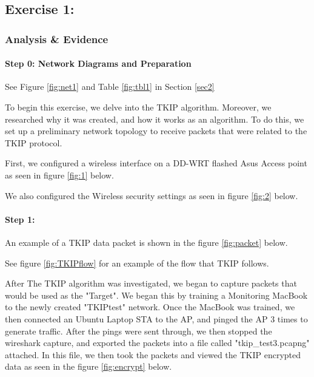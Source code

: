 \documentclass[main.tex]{subfiles}
\begin{document}
\subsection{Exercise 1: }
\subsubsection{Analysis \& Evidence }

\paragraph{Step 0: Network Diagrams and Preparation}
\hfill \break
See Figure \ref{fig:net1} and Table \ref{fig:tbl1} in Section \ref{sec2}

\noindent To begin this exercise, we delve into the TKIP algorithm. Moreover, we researched why it was created, and how it works as an algorithm. To do this, we set up a preliminary network topology to receive packets that were related to the TKIP protocol. 

First, we configured a wireless interface on a DD-WRT flashed Asus Access point as seen in figure \ref{fig:1} below.


We also configured the Wireless security settings as seen in figure \ref{fig:2} below. 


\paragraph{Step 1:}
\hfill \break

An example of a TKIP data packet is shown in the figure \ref{fig:packet} below.


See figure \ref{fig:TKIPflow} for an example of the flow that TKIP follows.
 
After The TKIP algorithm was investigated, we began to capture packets that would be used as the "Target". We began this by training a Monitoring MacBook to the newly created "TKIPtest" network. Once the MacBook was trained, we then connected an Ubuntu Laptop STA to the AP, and pinged the AP 3 times to generate traffic. After the pings were sent through, we then stopped the wireshark capture, and exported the packets into a file called "tkip\_test3.pcapng" attached. In this file, we then took the packets and viewed the TKIP encrypted data as seen in the figure \ref{fig:encrypt} below.
\end{document}
